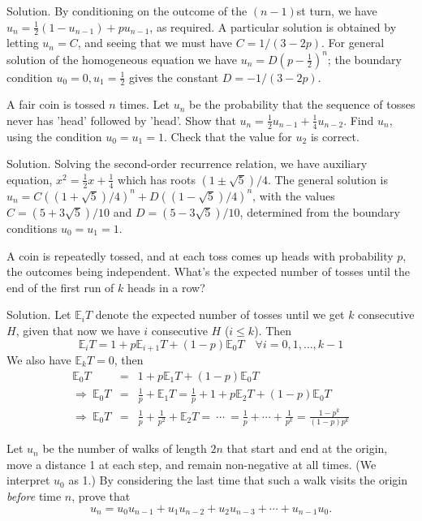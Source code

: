 Solution. By conditioning on the outcome of the $(n-1)$st turn, we have $u_n=\frac 12(1-u_{n-1}) + pu_{n-1}$, as required. A particular solution is obtained by letting $u_n=C$, and seeing that we must have $C=1/(3-2p)$. For general solution of the homogeneous equation we have $u_n=D(p-\frac 12)^n$; the boundary condition $u_0=0, u_1=\frac 12$ gives the constant $D=-1/(3-2p)$.


\item A fair coin is tossed $n$ times. Let $u_n$ be the probability that the sequence of tosses never has 'head' followed by 'head'. Show that $u_n=\frac 12u_{n-1}+\frac 14u_{n-2}$. Find $u_n$, using the condition $u_0=u_1=1$. Check that the value for $u_2$ is correct.



Solution. Solving the second-order recurrence relation, we have auxiliary equation, $x^2=\frac 12 x+\frac 14$ which has roots $(1\pm\sqrt{5})/4$. The general solution is $u_n=C((1+\sqrt{5})/4)^n+D((1-\sqrt{5})/4)^n$, with the values $C=(5+3\sqrt{5})/10$ and $D=(5-3\sqrt{5})/10$, determined from the boundary conditions $u_0=u_1=1$.


\item A coin is repeatedly tossed, and at each toss comes up heads with probability $p$, the outcomes being independent. What's the expected number of tosses until the end of the first run of $k$ heads in a row?



Solution. Let $\mathbb{E}_iT$ denote the expected number of tosses until we get $k$ consecutive $H$, given that now we have $i$ consecutive $H$ ($i\leq k$). Then 
\begin{equation}
\mathbb{E}_iT=1+ p\mathbb{E}_{i+1}T + (1-p)\mathbb{E}_0T \quad \forall i=0,1,\dots,k-1
\end{equation}
We also have $\mathbb{E}_kT=0$, then
\begin{eqnarray}
\mathbb{E}_0T & = & 1+ p\mathbb{E}_{1}T + (1-p)\mathbb{E}_0T \nonumber\\
\Rightarrow \ \mathbb{E}_0T & = & \frac 1p + \mathbb{E}_{1}T = \frac 1p + 1 + p\mathbb{E}_2T + (1-p)\mathbb{E}_0T\nonumber\\
\Rightarrow \ \mathbb{E}_0T & = & \frac{1}{p} + \frac{1}{p^2} + \mathbb{E}_2T =\ \cdots\ = \frac{1}{p} +\cdots+ \frac{1}{p^k} = \frac{1-p^k}{(1-p)p^k} 
\end{eqnarray}


\item Let $u_n$ be the number of walks of length $2n$ that start and end at the origin, move a distance 1 at each step, and remain non-negative at all times. (We interpret $u_0$ as 1.) By considering the last time that such a walk visits the origin \emph{before} time $n$, prove that
\begin{equation}
u_n=u_0u_{n-1}+u_1u_{n-2} + u_2u_{n-3} +\cdots + u_{n-1}u_0.
\end{equation}

